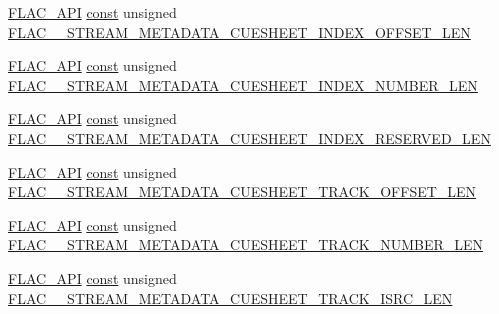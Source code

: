 \begin{DoxyCompactItemize}
\item 
\hyperlink{group__flac__export_ga56ca07df8a23310707732b1c0007d6f5}{F\+L\+A\+C\+\_\+\+A\+PI} \hyperlink{zconf_8h_a2c212835823e3c54a8ab6d95c652660e}{const} unsigned \hyperlink{group__flac__format_ga6579eee01a62ce96e3e243e3bd1ec478}{F\+L\+A\+C\+\_\+\+\_\+\+S\+T\+R\+E\+A\+M\+\_\+\+M\+E\+T\+A\+D\+A\+T\+A\+\_\+\+C\+U\+E\+S\+H\+E\+E\+T\+\_\+\+I\+N\+D\+E\+X\+\_\+\+O\+F\+F\+S\+E\+T\+\_\+\+L\+EN}
\item 
\hyperlink{group__flac__export_ga56ca07df8a23310707732b1c0007d6f5}{F\+L\+A\+C\+\_\+\+A\+PI} \hyperlink{zconf_8h_a2c212835823e3c54a8ab6d95c652660e}{const} unsigned \hyperlink{group__flac__format_ga1cbe4b28f16dd566feb74782f2728b0e}{F\+L\+A\+C\+\_\+\+\_\+\+S\+T\+R\+E\+A\+M\+\_\+\+M\+E\+T\+A\+D\+A\+T\+A\+\_\+\+C\+U\+E\+S\+H\+E\+E\+T\+\_\+\+I\+N\+D\+E\+X\+\_\+\+N\+U\+M\+B\+E\+R\+\_\+\+L\+EN}
\item 
\hyperlink{group__flac__export_ga56ca07df8a23310707732b1c0007d6f5}{F\+L\+A\+C\+\_\+\+A\+PI} \hyperlink{zconf_8h_a2c212835823e3c54a8ab6d95c652660e}{const} unsigned \hyperlink{group__flac__format_gaa3266be1c92182925c0d02c660617feb}{F\+L\+A\+C\+\_\+\+\_\+\+S\+T\+R\+E\+A\+M\+\_\+\+M\+E\+T\+A\+D\+A\+T\+A\+\_\+\+C\+U\+E\+S\+H\+E\+E\+T\+\_\+\+I\+N\+D\+E\+X\+\_\+\+R\+E\+S\+E\+R\+V\+E\+D\+\_\+\+L\+EN}
\item 
\hyperlink{group__flac__export_ga56ca07df8a23310707732b1c0007d6f5}{F\+L\+A\+C\+\_\+\+A\+PI} \hyperlink{zconf_8h_a2c212835823e3c54a8ab6d95c652660e}{const} unsigned \hyperlink{group__flac__format_ga2998481389f82ac8ec3c8aa1e405fb56}{F\+L\+A\+C\+\_\+\+\_\+\+S\+T\+R\+E\+A\+M\+\_\+\+M\+E\+T\+A\+D\+A\+T\+A\+\_\+\+C\+U\+E\+S\+H\+E\+E\+T\+\_\+\+T\+R\+A\+C\+K\+\_\+\+O\+F\+F\+S\+E\+T\+\_\+\+L\+EN}
\item 
\hyperlink{group__flac__export_ga56ca07df8a23310707732b1c0007d6f5}{F\+L\+A\+C\+\_\+\+A\+PI} \hyperlink{zconf_8h_a2c212835823e3c54a8ab6d95c652660e}{const} unsigned \hyperlink{group__flac__format_ga29c8c5cd71c4cc66ba322e3cf60c78a7}{F\+L\+A\+C\+\_\+\+\_\+\+S\+T\+R\+E\+A\+M\+\_\+\+M\+E\+T\+A\+D\+A\+T\+A\+\_\+\+C\+U\+E\+S\+H\+E\+E\+T\+\_\+\+T\+R\+A\+C\+K\+\_\+\+N\+U\+M\+B\+E\+R\+\_\+\+L\+EN}
\item 
\hyperlink{group__flac__export_ga56ca07df8a23310707732b1c0007d6f5}{F\+L\+A\+C\+\_\+\+A\+PI} \hyperlink{zconf_8h_a2c212835823e3c54a8ab6d95c652660e}{const} unsigned \hyperlink{group__flac__format_gac3f768f4fa5d8ea1d10a3884c29f4a35}{F\+L\+A\+C\+\_\+\+\_\+\+S\+T\+R\+E\+A\+M\+\_\+\+M\+E\+T\+A\+D\+A\+T\+A\+\_\+\+C\+U\+E\+S\+H\+E\+E\+T\+\_\+\+T\+R\+A\+C\+K\+\_\+\+I\+S\+R\+C\+\_\+\+L\+EN}

\end{DoxyCompactItemize}
